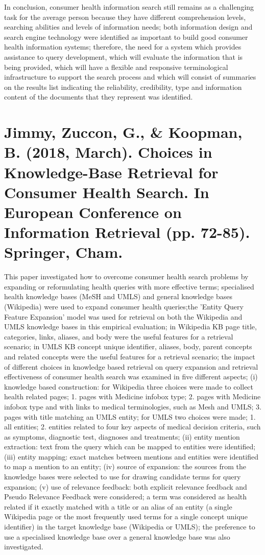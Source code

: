 \documentclass[]{article}
\begin{document}
In conclusion, consumer health information search still remains as a challenging task for the average person because they have different comprehension levels, searching abilities and levels of information needs; both information design and search engine technology were identified as important to build good consumer health information systems; therefore, the need for a system which provides assistance to query development, which will evaluate the information that is being provided, which will have a flexible and responsive terminological infrastructure to support the search process and which will consist of summaries on the results list indicating the  reliability, credibility, type and information content of the documents that they represent was identified.   

\section{Jimmy, Zuccon, G., \& Koopman, B. (2018, March). Choices in Knowledge-Base Retrieval for Consumer Health Search. In European Conference on Information Retrieval (pp. 72-85). Springer, Cham.}  

This paper investigated how to overcome consumer health search problems by expanding or reformulating health queries with more effective terms; specialised health knowledge bases (MeSH and UMLS) and general knowledge bases (Wikipedia) were used to expand consumer health queries;the 'Entity Query Feature Expansion' model was used for retrieval on both the Wikipedia and UMLS knowledge bases in this empirical evaluation;  in Wikipedia KB page title, categories, links, aliases, and body were the useful features for a retrieval scenario; in UMLS KB concept unique identifier, aliases, body, parent concepts and related concepts were the useful features for a retrieval scenario; the impact of different choices in knowledge based retrieval on query expansion and retrieval effectiveness of consumer health search was examined in five different aspects; (i) knowledge based construction: for Wikipedia three choices were made to collect health related pages; 1. pages with Medicine infobox type; 2. pages with Medicine infobox type and with links to medical terminologies, such as Mesh and UMLS; 3. pages with title matching an UMLS entity; for UMLS two choices were made; 1. all entities; 2. entities related to four key aspects of medical decision criteria, such as symptoms, diagnostic test, diagnoses and treatments; (ii) entity mention extraction: text from the query which can be mapped to entities were identified; (iii) entity mapping: exact matches between mentions and entities were identified to map a mention to an entity; (iv) source of expansion: the sources from the knowledge bases were selected to use for drawing candidate terms for query expansion; (v) use of relevance feedback: both explicit relevance feedback and Pseudo Relevance Feedback were considered; a term was considered as health related if it exactly matched with a title or an alias of an entity (a single Wikipedia page or the most frequently used terms for a single concept unique identifier) in the target knowledge base (Wikipedia or UMLS); the preference to use a specialised knowledge base over a general knowledge base was also investigated.
\end{document}
